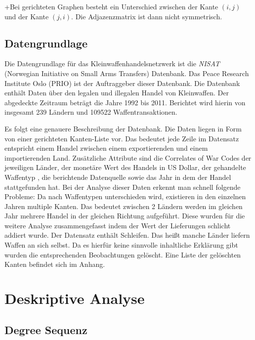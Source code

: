 \documentclass[a4paper,ngerman,oneside,titlepage,bibliography=totoc,11pt]{scrreprt}
\begin{document}
+Bei gerichteten Graphen besteht ein Unterschied zwischen der Kante $(i,j)$ und der Kante $(j,i)$. Die Adjazenzmatrix ist dann nicht symmetrisch.


\section{Datengrundlage}



Die Datengrundlage für das Kleinwaffenhandelsnetzwerk ist die \emph{NISAT} (Norwegian Initiative on Small Arms Transfers) Datenbank. Das Peace Research Institute Oslo (PRIO) ist der Auftraggeber dieser Datenbank. Die Datenbank enthält Daten über den legalen und illegalen Handel von Kleinwaffen. Der abgedeckte Zeitraum beträgt die Jahre 1992 bis 2011. Berichtet wird hierin von insgesamt 239 Ländern und 109522 Waffentransaktionen.

Es folgt eine genauere Beschreibung der Datenbank. Die Daten liegen in Form von einer gerichteten Kanten-Liste vor. Das bedeutet jede Zeile im Datensatz entspricht einem Handel zwischen einem exportierenden und einem importierenden Land. Zusätzliche Attribute sind die Correlates of War Codes der jeweiligen Länder, der monetäre Wert des Handels in US Dollar, der gehandelte Waffentyp , die berichtende Datenquelle sowie das Jahr in dem der Handel stattgefunden hat.
Bei der Analyse dieser Daten erkennt man schnell folgende Probleme:
Da nach Waffentypen unterschieden wird, existieren in den einzelnen Jahren multiple Kanten. Das bedeutet zwischen 2 Ländern werden im gleichen Jahr mehrere Handel in der gleichen Richtung aufgeführt. Diese wurden für die weitere Analyse zusammengefasst indem der Wert der Lieferungen schlicht addiert wurde.
Der Datensatz enthält Schleifen. Das heißt manche Länder liefern Waffen an sich selbst. Da es hierfür keine sinnvolle inhaltliche Erklärung gibt wurden die entsprechenden Beobachtungen gelöscht. Eine Liste der gelöschten Kanten befindet sich im Anhang.

\chapter{Deskriptive Analyse}

\section{Degree Sequenz}
\end{document}
